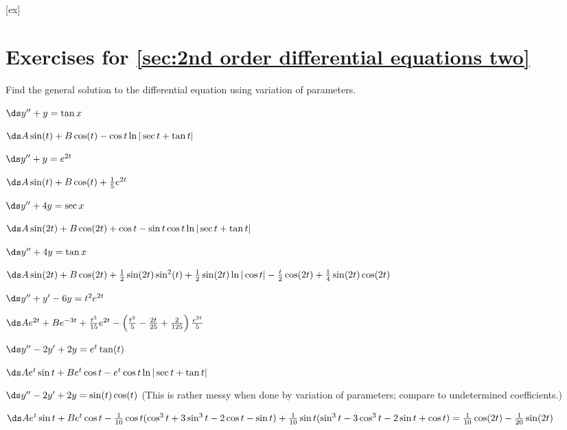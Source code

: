 [ex]
\section*{Exercises for \ref{sec:2nd order differential equations two}}

\begin{enumialphparenastyle}

Find the general solution to the differential equation using variation
of parameters.

\begin{ex}
 $\ds y''+y=\tan x$
\begin{sol}
 $\ds A\sin(t)+B\cos(t)-\hfill\break\cos t\ln|\sec t+\tan t|$
\end{sol}
\end{ex}


\begin{ex}
 $\ds y''+y=e^{2t}$
\begin{sol}
 $\ds A\sin(t)+B\cos(t)+{1\over5}e^{2t}$
\end{sol}
\end{ex}


\begin{ex}
 $\ds y''+4y=\sec x$
\begin{sol}
 $\ds A\sin(2t)+B\cos(2t)+\cos t-\sin t\cos t\ln|\sec t+\tan t|$
\end{sol}
\end{ex}


\begin{ex}
 $\ds y''+4y=\tan x$
\begin{sol}
 $\ds A\sin(2t)+B\cos(2t)+{1\over2}\sin(2t)\sin^2(t)+
{1\over2}\sin(2t)\ln|\cos t|-{t\over2}\cos(2t)+{1\over4}\sin(2t)\cos(2t)$
\end{sol}
\end{ex}


\begin{ex}
 $\ds y''+y'-6y=t^2e^{2t}$
\begin{sol}
 $\ds Ae^{2t}+Be^{-3t}+{t^3\over15}e^{2t}-\left({t^2\over5}
-{2t\over25}+{2\over125}\right){e^{2t}\over5}$
\end{sol}
\end{ex}


\begin{ex}
 $\ds y''-2y'+2y=e^{t}\tan(t)$
\begin{sol}
 $\ds Ae^{t}\sin t+Be^{t}\cos t-e^t\cos t\ln|\sec t+\tan t|$
\end{sol}
\end{ex}


\begin{ex}
 $\ds y''-2y'+2y=\sin(t)\cos(t)$ (This is rather messy
when done by variation of parameters; compare to undetermined coefficients.)
\begin{sol}
 $\ds Ae^{t}\sin t+Be^{t}\cos t-
{1\over10}\cos t(\cos^3 t+3\sin^3 t-2\cos t-\sin t)+
{1\over10}\sin t(\sin^3 t-3\cos^3 t-2\sin t+\cos t)=
{1\over10}\cos(2t)-{1\over20}\sin(2t)$
\end{sol}
\end{ex}

\end{enumialphparenastyle}